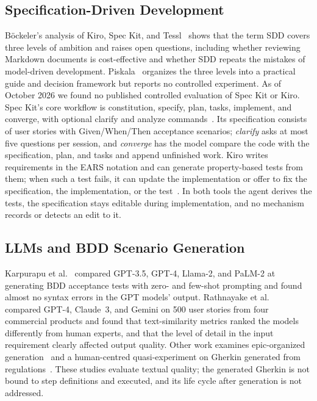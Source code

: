 \documentclass[conference]{IEEEtran}
\begin{document}
\subsection{Specification-Driven Development}

B\"ockeler's analysis of Kiro, Spec Kit, and Tessl~\cite{bockeler2025sdd} shows that the term SDD covers three levels of ambition and raises open questions, including whether reviewing Markdown documents is cost-effective and whether SDD repeats the mistakes of model-driven development. Piskala~\cite{piskala2026sdd} organizes the three levels into a practical guide and decision framework but reports no controlled experiment. As of October 2026 we found no published controlled evaluation of Spec Kit or Kiro. Spec Kit's core workflow is constitution, specify, plan, tasks, implement, and converge, with optional clarify and analyze commands~\cite{speckit2026}. Its specification consists of user stories with Given/When/Then acceptance scenarios; \emph{clarify} asks at most five questions per session, and \emph{converge} has the model compare the code with the specification, plan, and tasks and append unfinished work. Kiro writes requirements in the EARS notation and can generate property-based tests from them; when such a test fails, it can update the implementation or offer to fix the specification, the implementation, or the test~\cite{kiro2026correctness}. In both tools the agent derives the tests, the specification stays editable during implementation, and no mechanism records or detects an edit to it.

\subsection{LLMs and BDD Scenario Generation}

Karpurapu et al.~\cite{karpurapu2024bdd} compared GPT-3.5, GPT-4, Llama-2, and PaLM-2 at generating BDD acceptance tests with zero- and few-shot prompting and found almost no syntax errors in the GPT models' output. Rathnayake et al.~\cite{rathnayake2026bdd} compared GPT-4, Claude~3, and Gemini on 500 user stories from four commercial products and found that text-similarity metrics ranked the models differently from human experts, and that the level of detail in the input requirement clearly affected output quality. Other work examines epic-organized generation~\cite{siddeeq2026epic} and a human-centred quasi-experiment on Gherkin generated from regulations~\cite{hassani2025law}. These studies evaluate textual quality; the generated Gherkin is not bound to step definitions and executed, and its life cycle after generation is not addressed.
\end{document}
